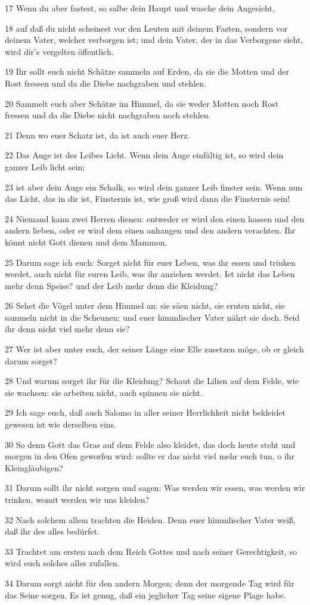 \par 17 Wenn du aber fastest, so salbe dein Haupt und wasche dein Angesicht,
\par 18 auf daß du nicht scheinest vor den Leuten mit deinem Fasten, sondern vor deinem Vater, welcher verborgen ist; und dein Vater, der in das Verborgene sieht, wird dir's vergelten öffentlich.
\par 19 Ihr sollt euch nicht Schätze sammeln auf Erden, da sie die Motten und der Rost fressen und da die Diebe nachgraben und stehlen.
\par 20 Sammelt euch aber Schätze im Himmel, da sie weder Motten noch Rost fressen und da die Diebe nicht nachgraben noch stehlen.
\par 21 Denn wo euer Schatz ist, da ist auch euer Herz.
\par 22 Das Auge ist des Leibes Licht. Wenn dein Auge einfältig ist, so wird dein ganzer Leib licht sein;
\par 23 ist aber dein Auge ein Schalk, so wird dein ganzer Leib finster sein. Wenn nun das Licht, das in dir ist, Finsternis ist, wie groß wird dann die Finsternis sein!
\par 24 Niemand kann zwei Herren dienen: entweder er wird den einen hassen und den andern lieben, oder er wird dem einen anhangen und den andern verachten. Ihr könnt nicht Gott dienen und dem Mammon.
\par 25 Darum sage ich euch: Sorget nicht für euer Leben, was ihr essen und trinken werdet, auch nicht für euren Leib, was ihr anziehen werdet. Ist nicht das Leben mehr denn Speise? und der Leib mehr denn die Kleidung?
\par 26 Sehet die Vögel unter dem Himmel an: sie säen nicht, sie ernten nicht, sie sammeln nicht in die Scheunen; und euer himmlischer Vater nährt sie doch. Seid ihr denn nicht viel mehr denn sie?
\par 27 Wer ist aber unter euch, der seiner Länge eine Elle zusetzen möge, ob er gleich darum sorget?
\par 28 Und warum sorget ihr für die Kleidung? Schaut die Lilien auf dem Felde, wie sie wachsen: sie arbeiten nicht, auch spinnen sie nicht.
\par 29 Ich sage euch, daß auch Salomo in aller seiner Herrlichkeit nicht bekleidet gewesen ist wie derselben eins.
\par 30 So denn Gott das Gras auf dem Felde also kleidet, das doch heute steht und morgen in den Ofen geworfen wird: sollte er das nicht viel mehr euch tun, o ihr Kleingläubigen?
\par 31 Darum sollt ihr nicht sorgen und sagen: Was werden wir essen, was werden wir trinken, womit werden wir uns kleiden?
\par 32 Nach solchem allem trachten die Heiden. Denn euer himmlischer Vater weiß, daß ihr des alles bedürfet.
\par 33 Trachtet am ersten nach dem Reich Gottes und nach seiner Gerechtigkeit, so wird euch solches alles zufallen.
\par 34 Darum sorgt nicht für den andern Morgen; denn der morgende Tag wird für das Seine sorgen. Es ist genug, daß ein jeglicher Tag seine eigene Plage habe.

